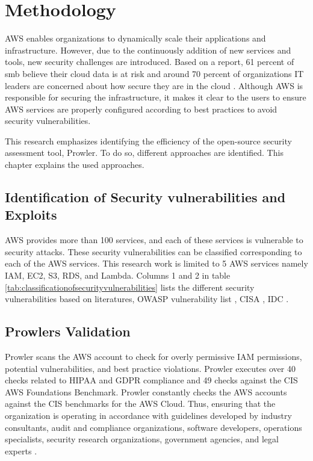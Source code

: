 
\chapter{Methodology}

\par AWS enables organizations to dynamically scale their applications and infrastructure.
However, due to the continuously addition of new services
and tools, new security challenges are
introduced.
Based on a report, 61 percent of \gls{smb} believe their
cloud
data is at risk and around 70 percent of organizations IT
leaders are concerned about how secure they are in the
cloud \cite{73}.
Although AWS is responsible for securing the infrastructure, it makes it clear to the users to ensure AWS services are properly configured according to best practices to avoid security vulnerabilities.

\par This research emphasizes identifying the efficiency of the open-source security assessment tool, Prowler.
To do so, different approaches are identified. This chapter explains the used approaches.


\section{Identification of Security vulnerabilities and Exploits}

\par AWS provides more than 100 services, and each of these services is vulnerable to security attacks.
These security vulnerabilities can be classified corresponding to each of the AWS services.
This research work is limited to 5 AWS services namely IAM, EC2, S3, RDS, and Lambda.
Columns 1 and 2 in table \ref{tab:classificationofsecurityvulnerabilities} lists the different security
vulnerabilities based on literatures, OWASP vulnerability
list \cite{51}, CISA \cite{52}, IDC \cite{53}.



\section{Prowlers Validation}

\par Prowler scans the AWS account to check for overly permissive IAM permissions, potential vulnerabilities, and best practice violations.
Prowler executes over 40 checks related to HIPAA and GDPR compliance and 49 checks against the CIS AWS Foundations Benchmark.
Prowler constantly checks the AWS accounts against the
CIS benchmarks for the AWS Cloud. Thus, ensuring that the
organization is operating in accordance with guidelines developed by industry consultants, audit and compliance organizations, software developers, operations specialists, security research organizations, government agencies, and legal experts \cite{74}.

